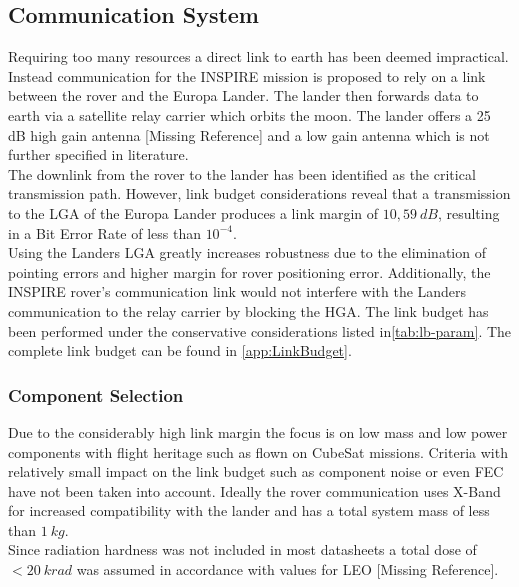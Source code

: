 \subsection{Communication System}
Requiring too many resources a direct link to earth has been deemed impractical. Instead communication for the INSPIRE mission is proposed to rely on a link between the rover and the Europa Lander. The lander then forwards data to earth via a satellite relay carrier which orbits the moon. The lander offers a 25 dB high gain antenna [Missing Reference] and a low gain antenna which is not further specified in literature.\\

The downlink from the rover to the lander has been identified as the critical transmission path. However, link budget considerations reveal that a transmission to the LGA of the Europa Lander produces a link margin of $10,59\ dB$, resulting in a Bit Error Rate of less than $10^{-4}$.\\

Using the Landers LGA greatly increases robustness due to the elimination of pointing errors and higher margin for rover positioning error. Additionally, the INSPIRE rover’s communication link would not interfere with the Landers communication to the relay carrier by blocking the HGA. The link budget has been performed under the conservative considerations listed in\autoref{tab:lb-param}. The complete link budget can be found in \autoref{app:LinkBudget}. 

\subsubsection{Component Selection}

Due to the considerably high link margin the focus is on low mass and low power components with flight heritage such as flown on CubeSat missions. Criteria with relatively small impact on the link budget such as component noise or even FEC have not been taken into account. Ideally the rover communication uses X-Band for increased compatibility with the lander and has a total system mass of less than $1\ kg$. \\
Since radiation hardness was not included in most datasheets a total dose of $<20\ krad$ was assumed in accordance with values for LEO [Missing Reference].

